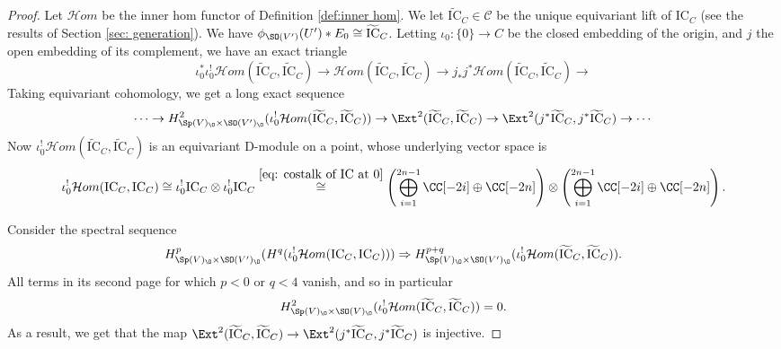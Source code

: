 \documentclass[11pt]{article}
\begin{document}
\begin{proof}
    
    Let $\mathcal{H}om$ be the inner hom functor of Definition \ref{def:inner hom}.
    We let $\widetilde{\mathrm{IC}}_C\in \mathcal{C}$ be the unique equivariant lift of $\mathrm{IC}_C$ (see the results of Section \ref{sec: generation}). We have $\phi_{\SO(V')}(U')*E_0\cong \widetilde{\mathrm{IC}}_C$.
    Letting $\iota_0:\{0\}\to C$ be the closed embedding of the origin, and $j$ the open embedding of its complement, we have an exact triangle
    $$\iota_0^* \iota_0^! \mathcal{H}om(\widetilde{\mathrm{IC}}_C, \widetilde{\mathrm{IC}}_C)\to \mathcal{H}om(\widetilde{\mathrm{IC}}_C, \widetilde{\mathrm{IC}}_C) \to j_* j^* \mathcal{H}om(\widetilde{\mathrm{IC}}_C, \widetilde{\mathrm{IC}}_C)\to$$
    Taking equivariant cohomology, we get a long exact sequence
    $$\cdots \to H^2_{\Sp(V)_\O\times \SO(V')_\O}(\iota_0^! \mathcal{H}om(\widetilde{\mathrm{IC}}_C, \widetilde{\mathrm{IC}}_C))\to \Ext^2(\widetilde{\mathrm{IC}}_C, \widetilde{\mathrm{IC}}_C)\to \Ext^2(j^*\widetilde{\mathrm{IC}}_C, j^*\widetilde{\mathrm{IC}}_C)\to \cdots$$
    Now $\iota_0^! \mathcal{H}om(\widetilde{\mathrm{IC}}_C, \widetilde{\mathrm{IC}}_C)$ is an equivariant D-module on a point, whose underlying vector space is $$\iota_0^!\mathcal{H}om(\mathrm{IC}_C, \mathrm{IC}_C) \cong \iota_0^!\mathrm{IC}_C \otimes \iota_0^!\mathrm{IC}_C\stackrel{\eqref{eq: costalk of IC at 0}}{\cong} \left(\bigoplus_{i=1}^{2n-1}\CC[-2i]\oplus \CC[-2n]\right)\otimes \left(\bigoplus_{i=1}^{2n-1}\CC[-2i]\oplus \CC[-2n]\right).$$

    Consider the spectral sequence $$H^p_{\Sp(V)_\O\times \SO(V')_\O}(H^q(\iota_0^! \mathcal{H}om(\mathrm{IC}_C, \mathrm{IC}_C)))\Rightarrow H^{p+q}_{\Sp(V)_\O\times \SO(V')_\O}(\iota_0^! \mathcal{H}om(\widetilde{\mathrm{IC}}_C, \widetilde{\mathrm{IC}}_C)).$$
    All terms in its second page for which $p<0$ or $q<4$ vanish, and so in particular $$H^2_{\Sp(V)_\O\times \SO(V)_\O}(\iota_0^! \mathcal{H}om(\widetilde{\mathrm{IC}}_C, \widetilde{\mathrm{IC}}_C))=0.$$
    As a result, we get that the map $\Ext^2(\widetilde{\mathrm{IC}}_C, \widetilde{\mathrm{IC}}_C)\to \Ext^2(j^*\widetilde{\mathrm{IC}}_C, j^*\widetilde{\mathrm{IC}}_C)$ is injective.


\end{proof}
\end{document}
